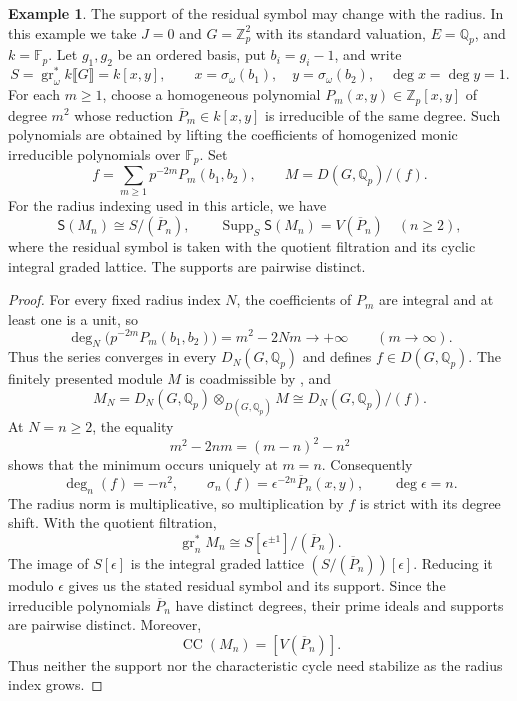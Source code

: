 \documentclass[11pt]{article}
\theoremstyle{definition}
\newtheorem{example}[theorem]{Example}
\newcommand{\gr}{\operatorname{gr}}
\newcommand{\CC}{\operatorname{CC}}
\newcommand{\Supp}{\operatorname{Supp}}
\begin{document}
\begin{example}\label{ex:radius-dependent-support}
The support of the residual symbol may change with the radius.
In this example we take $J=0$ and $G=\mathbb Z_p^2$ with its standard valuation,
$E=\mathbb Q_p$, and $k=\mathbb F_p$. Let $g_1,g_2$ be an ordered
basis, put $b_i=g_i-1$, and write
\[
 S=\gr_\omega^*k\llbracket G\rrbracket=k[x,y],\qquad
 x=\sigma_\omega(b_1),\quad y=\sigma_\omega(b_2),\quad
 \deg x=\deg y=1.
\]
For each $m\geq1$, choose a homogeneous polynomial
$P_m(x,y)\in\mathbb Z_p[x,y]$ of degree $m^2$ whose reduction
$\overline P_m\in k[x,y]$ is irreducible of the same degree.
Such polynomials are obtained by lifting the coefficients of
homogenized monic irreducible polynomials over $\mathbb F_p$.
Set
\[
 f=\sum_{m\geq1}p^{-2m}P_m(b_1,b_2),\qquad
 M=D(G,\mathbb Q_p)/(f).
\]
For the radius indexing used in this article, we have
\[
 \mathsf S(M_n)\cong S/(\overline P_n),\qquad
 \Supp_S\mathsf S(M_n)=V(\overline P_n)
 \quad(n\geq2),
\]
where the residual symbol is taken with the quotient filtration
and its cyclic integral graded lattice. The supports are pairwise
distinct.
\end{example}
\begin{proof}
For every fixed radius index $N$, the coefficients of $P_m$ are
integral and at least one is a unit, so
\[
 \deg_N\bigl(p^{-2m}P_m(b_1,b_2)\bigr)=m^2-2Nm
 \longrightarrow+\infty\qquad(m\to\infty).
\]
Thus the series converges in every $D_N(G,\mathbb Q_p)$ and
defines $f\in D(G,\mathbb Q_p)$. The finitely presented module
$M$ is coadmissible by \cite[Corollary~3.4(v)]{ST03}, and
\[
 M_N=D_N(G,\mathbb Q_p)\otimes_{D(G,\mathbb Q_p)}M
     \cong D_N(G,\mathbb Q_p)/(f).
\]
At $N=n\geq2$, the equality
\[
 m^2-2nm=(m-n)^2-n^2
\]
shows that the minimum occurs uniquely at $m=n$. Consequently
\[
 \deg_n(f)=-n^2,\qquad
 \sigma_n(f)=\epsilon^{-2n}\overline P_n(x,y),\qquad
 \deg\epsilon=n.
\]
The radius norm is multiplicative, so multiplication by $f$ is
strict with its degree shift. With the quotient filtration,
\[
 \gr_n^*M_n
 \cong S[\epsilon^{\pm1}]/(\overline P_n).
\]
The image of $S[\epsilon]$ is the integral graded lattice
$(S/(\overline P_n))[\epsilon]$. Reducing it modulo $\epsilon$
gives us the stated residual symbol and its support. Since the irreducible
polynomials $\overline P_n$ have distinct degrees, their prime
ideals and supports are pairwise distinct. Moreover,
\[
 \CC(M_n)=[V(\overline P_n)].
\]
Thus neither the support nor the characteristic cycle need
stabilize as the radius index grows. %
\end{proof}
\end{document}

